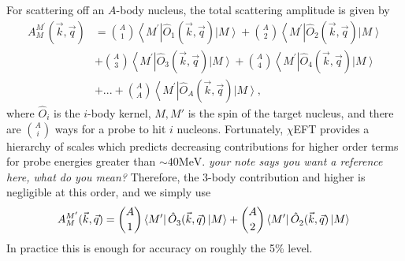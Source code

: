 \documentclass[a4paper,11pt]{article}
\newcommand\bv[1]{\vec{#1}}
\newcommand{\ques}[1]{\color{red}\textit{ #1 }\color{black}}
\newcommand{\MeV}{\mathrm{MeV}}
\begin{document}
For scattering off an $A$-body nucleus, the total scattering
amplitude is given by
\begin{align}
  A_{M}^{M^{\prime} }(\bv{k}, \bv{q})&=\binom{A}{1}\left\langle
  M^{\prime}\right|\hat{O}_{1}^{}(\bv{k}, \bv{q})\left|M\right
  \rangle + \binom{A}{2} \left\langle
  M^{\prime}\right|\hat{O}_{2}^{}(\bv{k}, \bv{q}) \left|
  M\right\rangle\nonumber\\
  &+ \binom{A}{3}\left\langle
  M^{\prime}\right|\hat{O}_{3}^{}(\bv{k}, \bv{q})\left|M\right
  \rangle + \binom{A}{4} \left\langle
  M^{\prime}\right|\hat{O}_{4}^{}(\bv{k}, \bv{q}) \left| M\right\rangle\\
  &+... + \binom{A}{A}\left\langle
  M^{\prime}\right|\hat{O}_{A}^{}(\bv{k}, \bv{q})\left|M\right
  \rangle,\nonumber
\end{align}
where $\hat{O}_i$ is the $i$-body kernel, $M,M'$ is the spin of the target nucleus, and there are
$\binom{A}{i}$ ways for a probe to hit $i$ nucleons. Fortunately,
$\chi$EFT provides a hierarchy of scales which predicts decreasing
contributions for higher order terms for probe energies greater than $\sim 40 \MeV$.
\ques{your note says you want a reference here, what do you mean?}
Therefore, the 3-body contribution and higher is negligible at this order, and we simply use
\begin{equation}
  A_{M}^{M^{\prime} }(\bv{k}, \bv{q})=\binom{A}{1}\left\langle
  M^{\prime}\right|\hat{O}_{3}^{}(\bv{k}, \bv{q})\left|M\right
  \rangle + \binom{A}{2} \left\langle
  M^{\prime}\right|\hat{O}_{2}^{}(\bv{k}, \bv{q}) \left|
  M\right\rangle\nonumber\\
\end{equation}
In practice this is enough for accuracy on roughly the 5\% level.
\end{document}
